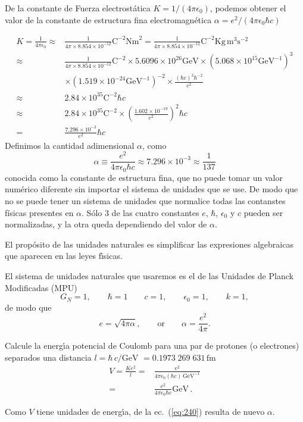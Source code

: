 \begin{frame}
De la constante de Fuerza electrost\'atica $K=1/(4\pi\epsilon_0)$, podemos obtener el valor de la constante de estructura fina electromagn\'etica $\alpha=e^2/(4\pi\epsilon_0\hbar c)$

\begin{align*}
  K=\frac{1}{4\pi\epsilon_0}\approx&\frac{1}{4\pi\times8.854\times10^{-12}}\text{C}^{-2}\text{Nm}^2
  =\frac{1}{4\pi\times8.854\times10^{-12}}\text{C}^{-2}\text{Kg}\,\text{m}^3\text{s}^{-2}\\
  \approx&\frac{1}{4\pi\times8.854\times10^{-12}}\text{C}^{-2}\times5.6096\times10^{26}\text{GeV}
  \times(5.068\times10^{15}\text{GeV}^{-1})^3\\
  &\times(1.519\times10^{-24}\text{GeV}^{-1})^{-2}\times\frac{(\hbar c)^3\hbar^{-2}}{c^2}\\
  \approx&2.84\times10^{35}\text{C}^{-2}\hbar c\\
  \approx&2.84\times10^{35}\text{C}^{-2}\times
  \left(
    \frac{1.602\times10^{-19}}{e^2}
  \right)^2\hbar c\\
  =&\frac{7.296\times10^{-3}}{e^2}\hbar c
\end{align*}
Definimos la cantidad adimensional $\alpha$, como
\begin{equation*}
  \alpha\equiv\frac{e^2}{4\pi\epsilon_0\hbar c}
\approx7.296\times10^{-3}\approx\frac{1}{137}
\end{equation*}
conocida como la constante de estructura fina, que no puede tomar un
valor numérico diferente sin importar el sistema de unidades que se
use. De modo que no se puede tener un sistema de unidades que
normalice todas las contanstes físicas presentes en
$\alpha$. Sólo 3 de las cuatro constantes $e$, $\hbar$, $\epsilon_0$
y $c$ pueden ser normalizadas, y la otra queda dependiendo del valor
de $\alpha$.

El prop\'osito de las unidades naturales es simplificar las expresiones algebraicas que aparecen en las leyes f\'\i sicas. 

El sistema de unidades naturales que usaremos es el de las Unidades de Planck Modificadas (MPU)
\begin{equation}
  G_N=1,\qquad \hbar=1 \qquad c=1,\qquad \epsilon_0=1,\qquad k=1,
\end{equation}
de modo que
\begin{equation}
  e=\sqrt{4\pi\alpha},\qquad\text{or}\qquad \alpha=\frac{e^2}{4\pi}.
\end{equation}
  

\begin{example}
  Calcule la energ\'\i a potencial de Coulomb para una par de protones (o electrones) separados una distancia $l=\hbar\,c/\text{GeV}$ $=0.1973\;269\;631\,\text{fm}$
  \begin{align}
    \label{eq:240}
    V=\frac{K e^2}{l}=&\frac{e^2}{4\pi\epsilon_0(\hbar c)\,\text{GeV}^{-1}}\nonumber\\
    =&\frac{e^2}{4\pi\epsilon_0\hbar c}\text{GeV}\,.
  \end{align}
\end{example}
Como $V$ tiene unidades de energ\'\i a, de la ec.~(\ref{eq:240})  resulta de nuevo $\alpha$.
\end{frame}
